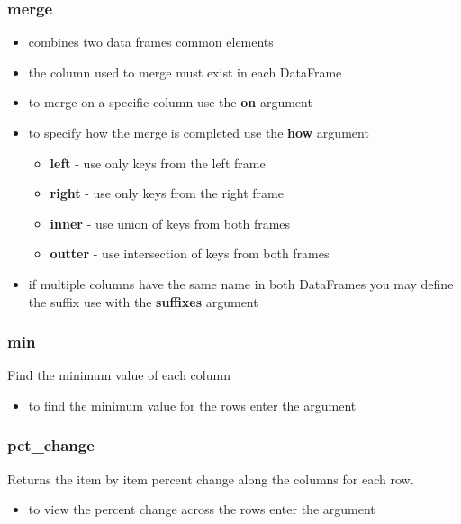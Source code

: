 %
\subsubsection{merge}
  \begin{itemize}
    \item combines two data frames common elements
    \item the column used to merge must exist in each DataFrame
    \item to merge on a specific column use the \textbf{on} argument
    \item to specify how the merge is completed use the \textbf{how} argument
      \begin{itemize}
        \item \textbf{left} - use only keys from the left frame
        \item \textbf{right} - use only keys from the right frame
        \item \textbf{inner} - use union of keys from both frames
        \item \textbf{outter} - use intersection of keys from both frames
      \end{itemize}
    \item if multiple columns have the same name in both DataFrames you may
      define the suffix use with the \textbf{suffixes} argument
  \end{itemize}

%
\subsubsection{min}
Find the minimum value of each column
  \begin{itemize}

    \item to find the minimum value for the rows enter the argument
      \color{red}{axis=1}
  \end{itemize}

%
\subsubsection{pct\_change}
Returns the item by item percent change along the columns for each row.
  \begin{itemize}

    \item to view the percent change across the rows enter the argument
      \color{red}{axis=1}
  \end{itemize}

